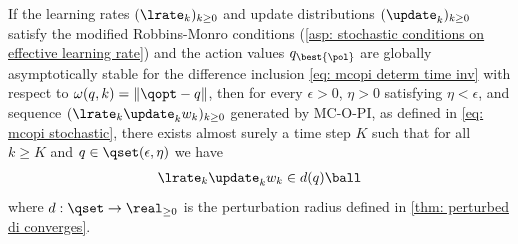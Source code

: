 \begin{lemma}
\label{thm: mc-opi behaves like perturbed sys}
    If the learning rates $(\lrate_k)_{k \geq 0}$ and update distributions $(\update_k)_{k \geq 0}$ satisfy the modified Robbins-Monro conditions (\autoref{asp: stochastic conditions on effective learning rate})
    and 
    the action values $q_{\best{\pol}}$ are globally asymptotically stable for 
    the difference inclusion \eqref{eq: mcopi determ time inv} with respect to $\omega(q, k) = \|\qopt - q\|$,
    then for every $\epsilon>0$, $\eta>0$
    satisfying $\eta < \epsilon$,
    and sequence $(\lrate_k \update_k w_k)_{k \geq 0}$ generated by MC-O-PI, as defined in \eqref{eq: mcopi stochastic},
    there exists almost surely a time step $K$ such that for all $k \geq K$ and $q \in \qset(\epsilon, \eta)$ we have
    \begin{align}
        \lrate_k \update_k w_k \in d(q) \ball 
    \end{align}
    where $d : \qset \to \real_{\geq 0}$ is the perturbation radius defined in \autoref{thm: perturbed di converges}.

    

\end{lemma}
